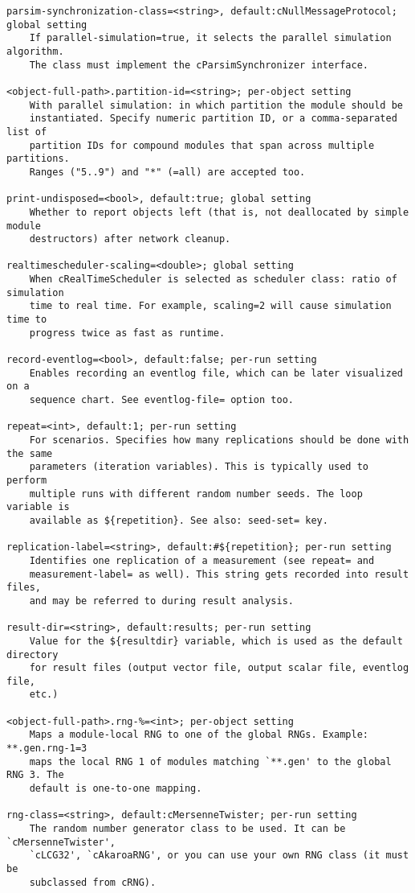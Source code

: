 \begin{verbatim}
parsim-synchronization-class=<string>, default:cNullMessageProtocol; global setting
    If parallel-simulation=true, it selects the parallel simulation algorithm.
    The class must implement the cParsimSynchronizer interface.

<object-full-path>.partition-id=<string>; per-object setting
    With parallel simulation: in which partition the module should be
    instantiated. Specify numeric partition ID, or a comma-separated list of
    partition IDs for compound modules that span across multiple partitions.
    Ranges ("5..9") and "*" (=all) are accepted too.

print-undisposed=<bool>, default:true; global setting
    Whether to report objects left (that is, not deallocated by simple module
    destructors) after network cleanup.

realtimescheduler-scaling=<double>; global setting
    When cRealTimeScheduler is selected as scheduler class: ratio of simulation
    time to real time. For example, scaling=2 will cause simulation time to
    progress twice as fast as runtime.

record-eventlog=<bool>, default:false; per-run setting
    Enables recording an eventlog file, which can be later visualized on a
    sequence chart. See eventlog-file= option too.

repeat=<int>, default:1; per-run setting
    For scenarios. Specifies how many replications should be done with the same
    parameters (iteration variables). This is typically used to perform
    multiple runs with different random number seeds. The loop variable is
    available as ${repetition}. See also: seed-set= key.

replication-label=<string>, default:#${repetition}; per-run setting
    Identifies one replication of a measurement (see repeat= and
    measurement-label= as well). This string gets recorded into result files,
    and may be referred to during result analysis.

result-dir=<string>, default:results; per-run setting
    Value for the ${resultdir} variable, which is used as the default directory
    for result files (output vector file, output scalar file, eventlog file,
    etc.)

<object-full-path>.rng-%=<int>; per-object setting
    Maps a module-local RNG to one of the global RNGs. Example: **.gen.rng-1=3
    maps the local RNG 1 of modules matching `**.gen' to the global RNG 3. The
    default is one-to-one mapping.

rng-class=<string>, default:cMersenneTwister; per-run setting
    The random number generator class to be used. It can be `cMersenneTwister',
    `cLCG32', `cAkaroaRNG', or you can use your own RNG class (it must be
    subclassed from cRNG).


\end{verbatim}
